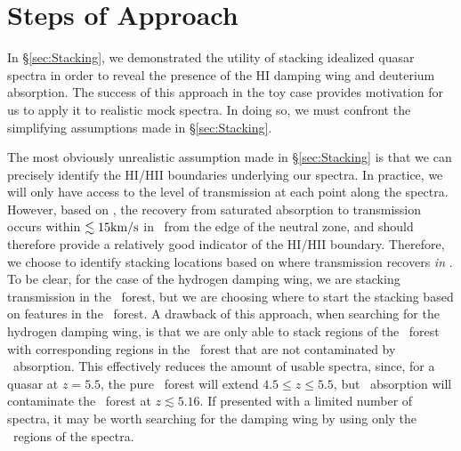 \section{Steps of Approach} \label{sec:RealSpectra}


In \S\ref{sec:Stacking}, we demonstrated the utility of stacking idealized quasar spectra in order to reveal the presence of the HI damping wing and deuterium absorption. The success of this approach in the toy case provides motivation for us to apply it to realistic mock spectra. In doing so, we must confront the simplifying assumptions made in \S\ref{sec:Stacking}. 


The most obviously unrealistic assumption made in \S\ref{sec:Stacking} is that we can precisely identify the HI/HII boundaries underlying our spectra. In practice, we will only have access to the level of transmission at each point along the spectra. However, based on , the recovery from saturated absorption to transmission occurs within $\lesssim 15\text{km}/\text{s}$ in \lyb\ from the edge of the neutral zone, and should therefore provide a relatively
good indicator of the HI/HII boundary. Therefore, we choose to identify stacking locations based on where transmission recovers \textit{in \lyb}.
To be clear, for the case of the hydrogen damping wing, we are stacking transmission in the \lya\ forest, but we are choosing where to start the stacking based on features in the \lyb\ forest. A drawback of this approach, when searching for the hydrogen damping wing, is that we are only able to stack regions of the \lya\ forest with corresponding regions in the \lyb\ forest that are not contaminated by \lyc\ absorption. This effectively reduces the amount of usable spectra, since, for a quasar at $z = 5.5$, the pure \lya\ forest will extend $4.5 \leq z \leq 5.5$, but \lyc\ absorption will contaminate the \lyb\ forest at $z \lesssim 5.16$. If presented with a limited number of spectra, it may be worth searching for the damping wing by using only the \lya\ regions of the spectra. 


